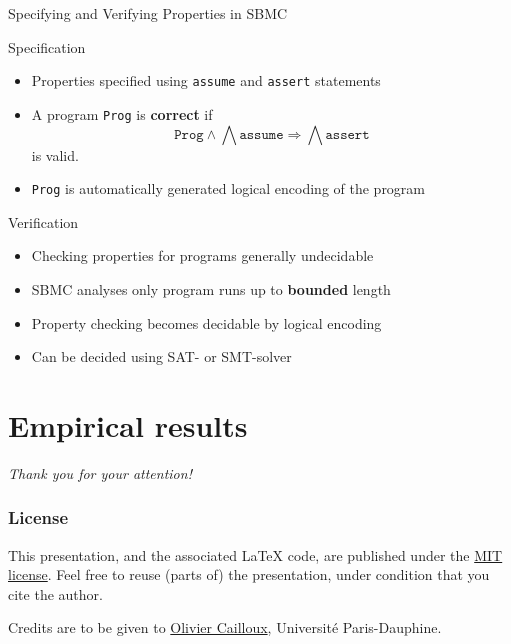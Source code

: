 \documentclass[french,english]{beamer}
\begin{document}
\begin{frame}{Specifying and Verifying Properties in SBMC\hspace*{-1.8em}}
\begin{block}{Specification}
\begin{itemize}
\item Properties specified using \texttt{assume} and \texttt{assert} statements
\item A program \texttt{Prog} is \textbf{correct} if
\[ \texttt{Prog} \wedge \bigwedge \texttt{assume} \Rightarrow \bigwedge \texttt{assert} \]
is valid.
\item \texttt{Prog} is automatically generated logical encoding of the program
\end{itemize}
\end{block}

\pause

\begin{block}{Verification}
\begin{itemize}
\item Checking properties for programs generally undecidable
\item SBMC analyses only program runs up to \textbf{bounded} length
\item Property checking becomes decidable by logical encoding
\item Can be decided using SAT- or SMT-solver
\end{itemize}
\end{block}
\end{frame}

\section{Empirical results}

\begin{frame}[plain]
	\addtocounter{framenumber}{-1}
	\begin{center}
		\huge
		\textit{Thank you for your attention!}
	\end{center}
\end{frame}

\appendix
\AtBeginSection{
}

\clearpage{}
\begin{frame}[allowframebreaks]
	\frametitle{\refname}
 	
\end{frame}

\clearpage{}
\begin{frame}[plain]
	\frametitle{License}
	This presentation, and the associated \LaTeX{} code, are published under the \href{http://opensource.org/licenses/MIT}{MIT license}. Feel free to reuse (parts of) the presentation, under condition that you cite the author.
	
	Credits are to be given to \href{http://www.lamsade.dauphine.fr/~ocailloux/}{Olivier Cailloux}, Université Paris-Dauphine.
\end{frame}
\addtocounter{framenumber}{-1}
\end{document}
